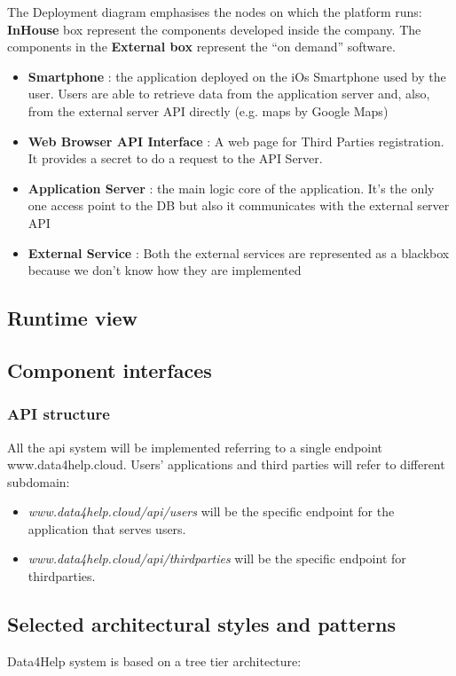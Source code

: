 \documentclass[DD.tex]{subfiles}
\begin{document}
The Deployment diagram emphasises the nodes on which the platform runs:\\
\textbf{InHouse} box represent the components developed inside the company.
The components in the \textbf{External box} represent the “on demand” software.\\
\begin{itemize}
\item	\textbf{Smartphone} : the application deployed on the iOs Smartphone used by the user. Users are able to retrieve data from the application server and, also, from the external 			server API directly (e.g. maps by Google Maps)
\item \textbf{Web Browser API Interface} : A web page for Third Parties registration. It provides a secret to do a request to the API Server.
\item \textbf{Application Server }: the  main logic core of the application. It’s the only one access point to the DB but also it communicates with the external server API
\item  \textbf{External Service} : Both the external services are represented as a blackbox because we don’t know how they are implemented 
\end{itemize}


\subsection{Runtime view}
\subsection{Component interfaces}
\subsubsection{API structure}

All the api system will be implemented referring to a single endpoint www.data4help.cloud. Users' applications and third parties will refer to different subdomain:

\begin{itemize}
	\item \textit{www.data4help.cloud/api/users} will be the specific endpoint for the application that serves users.
	\item \textit{www.data4help.cloud/api/thirdparties} will be the specific endpoint for thirdparties.
\end{itemize}

\newpage
\subsection{Selected architectural styles and patterns}
Data4Help system is based on a tree tier architecture:
\end{document}
